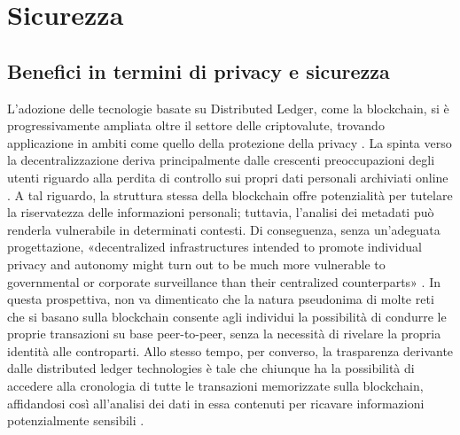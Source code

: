 \chapter{Sicurezza}
\section{Benefici in termini di privacy e sicurezza}
L'adozione delle tecnologie basate su Distributed Ledger, come la blockchain, si è progressivamente ampliata oltre il settore delle criptovalute, trovando applicazione in ambiti come quello della protezione della privacy \cite{borroni_blockchain_2019}.
La spinta verso la decentralizzazione deriva principalmente dalle crescenti preoccupazioni degli utenti riguardo alla perdita di controllo sui propri dati personali archiviati online \cite{rodota_quattro_paradigmi_2018} \cite{alpa_identita_digitale_2017}.
A tal riguardo, la struttura stessa della blockchain offre potenzialità per tutelare la riservatezza delle informazioni personali; tuttavia, l'analisi dei metadati può renderla vulnerabile in determinati contesti. Di conseguenza, senza un'adeguata progettazione,
«decentralized infrastructures intended to promote individual privacy and autonomy might turn out to be much more vulnerable to governmental or corporate surveillance than their centralized counterparts» \cite{de_filippi_interplay_2016}.
In questa prospettiva, non va dimenticato che la natura pseudonima di molte
reti che si basano sulla blockchain consente agli individui la possibilità di
condurre le proprie transazioni su base peer-to-peer, senza la necessità di
rivelare la propria identità alle controparti.
Allo stesso tempo, per converso, la trasparenza derivante dalle distributed ledger technologies è tale che chiunque ha la possibilità di accedere alla
cronologia di tutte le transazioni memorizzate sulla blockchain, affidandosi così all’analisi dei dati in essa contenuti per ricavare informazioni potenzialmente sensibili \cite{marr_history_blockchain_2018}.
